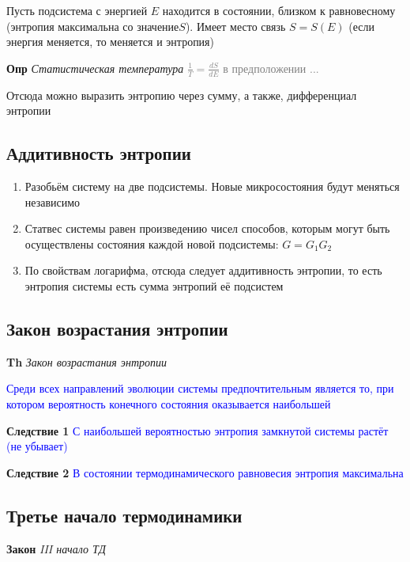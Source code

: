 \documentclass[a4paper, 14pt]{article}
\begin{document}
    Пусть подсистема с энергией $E$ находится в состоянии, близком к равновесному (энтропия максимальна со значение$S$).
    Имеет место связь $S = S(E)$ (если энергия меняется, то меняется и энтропия)

    \textbf{Опр} \textit{Статистическая температура} \textcolor{gray}{$\frac{1}{T} = \frac{dS}{dE}$ в предположении ...}

    Отсюда можно выразить энтропию через сумму, а также, дифференциал энтропии

    \subsection{Аддитивность энтропии}

    \begin{enumerate}
        \item Разобьём систему на две подсистемы.
        Новые микросостояния будут меняться независимо
        \item Статвес системы равен произведению чисел способов, которым могут быть осуществлены состояния каждой
        новой подсистемы: $G = G_1 G_2$
        \item По свойствам логарифма, отсюда следует аддитивность энтропии, то есть энтропия системы есть сумма
        энтропий её подсистем
    \end{enumerate}

    \subsection{Закон возрастания энтропии}

    \textbf{Th} \textit{Закон возрастания энтропии}

    \textcolor{blue}{Среди всех направлений эволюции системы предпочтительным является то, при котором вероятность
    конечного состояния оказывается наибольшей}

    \textbf{Следствие 1} \textcolor{blue}{С наибольшей вероятностью энтропия замкнутой системы растёт (не убывает)}

    \textbf{Следствие 2} \textcolor{blue}{В состоянии термодинамического равновесия энтропия максимальна}

    \subsection{Третье начало термодинамики}

    \textbf{Закон} \textit{III начало ТД}
\end{document}
